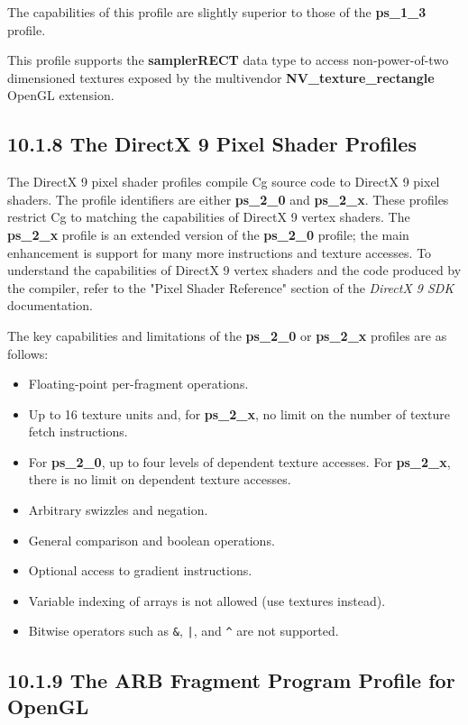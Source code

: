 \documentclass[../main.tex]{subfiles}
\begin{document}
The capabilities of this profile are slightly superior to those of the \textbf{ps_1_3} profile.

This profile supports the \textbf{samplerRECT} data type to access non-power-of-two dimensioned textures exposed by the multivendor \textbf{NV_texture_rectangle} OpenGL extension.

\subsection{10.1.8 The DirectX 9 Pixel Shader Profiles}

The DirectX 9 pixel shader profiles compile Cg source code to DirectX 9 pixel shaders. The profile identifiers are either \textbf{ps_2_0} and \textbf{ps_2_x}. These profiles restrict Cg to matching the capabilities of DirectX 9 vertex shaders. The \textbf{ps_2_x} profile is an extended version of the \textbf{ps_2_0} profile; the main enhancement is support for many more instructions and texture accesses. To understand the capabilities of DirectX 9 vertex shaders and the code produced by the compiler, refer to the "Pixel Shader Reference" section of the \textit{DirectX 9 SDK} documentation.

The key capabilities and limitations of the \textbf{ps_2_0} or \textbf{ps_2_x} profiles are as follows:

\begin{itemize}
\item Floating-point per-fragment operations.
\item Up to 16 texture units and, for \textbf{ps_2_x}, no limit on the number of texture fetch instructions.
\item For \textbf{ps_2_0}, up to four levels of dependent texture accesses. For \textbf{ps_2_x}, there is no limit on dependent texture accesses.
\item Arbitrary swizzles and negation.
\item General comparison and boolean operations.
\item Optional access to gradient instructions.
\item Variable indexing of arrays is not allowed (use textures instead).
\item Bitwise operators such as \verb!&!, \verb!|!, and \verb!^! are not supported.
\end{itemize}

\subsection{10.1.9 The ARB Fragment Program Profile for OpenGL}
\end{document}

